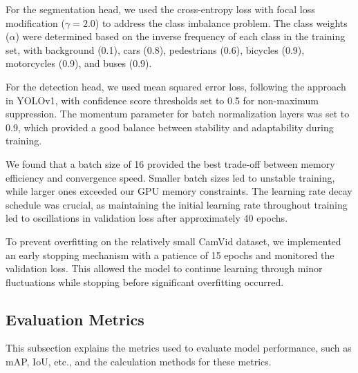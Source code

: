 \documentclass[conference]{IEEEtran}
\begin{document}




For the segmentation head, we used the cross-entropy loss with focal loss modification ($\gamma=2.0$) to address the class imbalance problem. The class weights ($\alpha$) were determined based on the inverse frequency of each class in the training set, with background (0.1), cars (0.8), pedestrians (0.6), bicycles (0.9), motorcycles (0.9), and buses (0.9).

For the detection head, we used mean squared error loss, following the approach in YOLOv1, with confidence score thresholds set to 0.5 for non-maximum suppression. The momentum parameter for batch normalization layers was set to 0.9, which provided a good balance between stability and adaptability during training.

We found that a batch size of 16 provided the best trade-off between memory efficiency and convergence speed. Smaller batch sizes led to unstable training, while larger ones exceeded our GPU memory constraints. The learning rate decay schedule was crucial, as maintaining the initial learning rate throughout training led to oscillations in validation loss after approximately 40 epochs.

To prevent overfitting on the relatively small CamVid dataset, we implemented an early stopping mechanism with a patience of 15 epochs and monitored the validation loss. This allowed the model to continue learning through minor fluctuations while stopping before significant overfitting occurred.



\subsection{Evaluation Metrics}
This subsection explains the metrics used to evaluate model performance, such as mAP, IoU, etc., and the calculation methods for these metrics.
\end{document}
